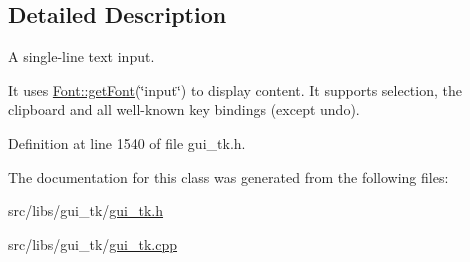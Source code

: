 \subsection{Detailed Description}
A single-\/line text input. 

It uses \hyperlink{classGUI_1_1Font_a19c023d747809a4cfa6142d33bdff53a}{Font\-::get\-Font}(\char`\"{}input\char`\"{}) to display content. It supports selection, the clipboard and all well-\/known key bindings (except undo). 

Definition at line 1540 of file gui\-\_\-tk.\-h.



The documentation for this class was generated from the following files\-:\begin{DoxyCompactItemize}
\item 
src/libs/gui\-\_\-tk/\hyperlink{gui__tk_8h}{gui\-\_\-tk.\-h}\item 
src/libs/gui\-\_\-tk/\hyperlink{gui__tk_8cpp}{gui\-\_\-tk.\-cpp}\end{DoxyCompactItemize}
